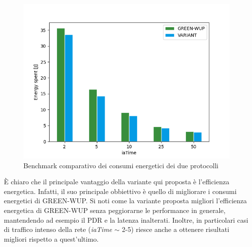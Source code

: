 \documentclass{report}
\begin{document}
\begin{figure}
    \begin{center}
        \includegraphics[scale=0.5]{energy_plot.png}
        \caption{Benchmark comparativo dei consumi energetici dei due protocolli}
    \end{center}
\end{figure}

È chiaro che il principale vantaggio della variante qui proposta è l'efficienza energetica. Infatti, il suo principale obbiettivo è quello di migliorare i consumi
energetici di GREEN-WUP. Si noti come la variante proposta migliori l'efficienza energetica di GREEN-WUP senza peggiorarne le performance in generale,
mantendendo ad esempio il PDR e la latenza inalterati. Inoltre, in particolari casi di traffico intenso della rete (\emph{iaTime} $\sim$ 2-5) riesce anche a
ottenere risultati migliori rispetto a quest'ultimo.

\end{document}
